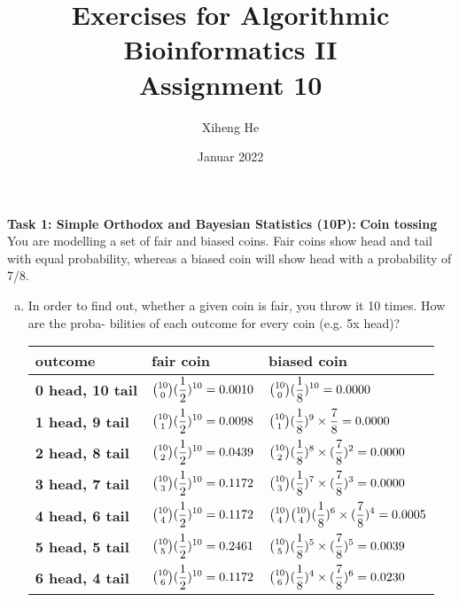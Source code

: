 \documentclass{article}
\title{Exercises for Algorithmic Bioinformatics II\\
Assignment 10}
\author{Xiheng He}
\date{Januar 2022}
\begin{document}
{\let\newpage\relax\maketitle}
\begin{flushleft}
\textbf{Task 1: Simple Orthodox and Bayesian Statistics (10P):}
\newline
\textbf{Coin tossing}
\newline
You are modelling a set of fair and biased coins. Fair coins show head and tail with equal probability,
whereas a biased coin will show head with a probability of 7/8.
\begin{enumerate}[(a)]
    \item In order to find out, whether a given coin is fair, you throw it 10 times. How are the proba-
    bilities of each outcome for every coin (e.g. 5x head)?
    \newline \\
    \begin{tabular}{|m{10em}|m{10em}|m{15em}|}
    \hline
    \textbf{outcome} & \textbf{fair coin} & \textbf{biased coin} \\
    \hline
    \textbf{0 head, 10 tail} & $\tbinom{10}{0}(\displaystyle\frac{1}{2})^{10} = 0.0010$ & $\tbinom{10}{0}(\displaystyle\frac{1}{8})^{10} = 0.0000$ \\ 
    \hline
    \textbf{1 head, 9 tail} & $\tbinom{10}{1}(\displaystyle\frac{1}{2})^{10} = 0.0098$ & $\tbinom{10}{1}(\displaystyle\frac{1}{8})^{9} \times \frac{7}{8} = 0.0000$ \\
    \hline
    \textbf{2 head, 8 tail} & $\tbinom{10}{2}(\displaystyle\frac{1}{2})^{10} = 0.0439$ & $\tbinom{10}{2}(\displaystyle\frac{1}{8})^{8} \times (\frac{7}{8})^2 = 0.0000$ \\
    \hline
    \textbf{3 head, 7 tail} & $\tbinom{10}{3}(\displaystyle\frac{1}{2})^{10} = 0.1172$ & $\tbinom{10}{3}(\displaystyle\frac{1}{8})^{7} \times (\frac{7}{8})^3 = 0.0000$ \\
    \hline
    \textbf{4 head, 6 tail} & $\tbinom{10}{4}(\displaystyle\frac{1}{2})^{10} = 0.1172$ & $\tbinom{10}{4}\tbinom{10}{4}(\displaystyle\frac{1}{8})^{6} \times (\frac{7}{8})^4 = 0.0005$ \\
    \hline
    \textbf{5 head, 5 tail} & $\tbinom{10}{5}(\displaystyle\frac{1}{2})^{10} = 0.2461$ & $\tbinom{10}{5}(\displaystyle\frac{1}{8})^{5} \times (\frac{7}{8})^5 = 0.0039$ \\
    \hline
    \textbf{6 head, 4 tail} & $\tbinom{10}{6}(\displaystyle\frac{1}{2})^{10} = 0.1172$ & $\tbinom{10}{6}(\displaystyle\frac{1}{8})^{4} \times (\frac{7}{8})^6 = 0.0230$ \\

\end{tabular}
\end{enumerate}
\end{flushleft}
\end{document}
